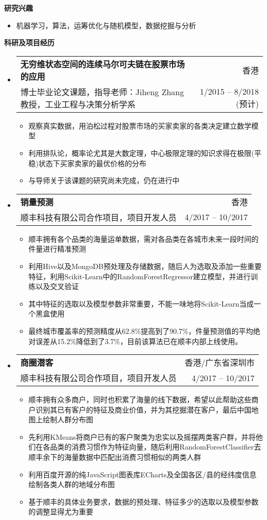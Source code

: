 \documentclass[letterpaper,9pt]{ctexart}
\makeatletter
\newcommand{\resitem}[1]{\item #1 \vspace{-2pt}}
\newcommand{\resheading}[1]{{\large \colorbox{mygrey}{\begin{minipage}{\textwidth}{\textbf{#1 \vphantom{p\^{E}}}}\end{minipage}}}}
\newcommand{\ressubheading}[4]{
\begin{tabular*}{6.5in}{l@{\extracolsep{\fill}}r}
    \textbf{#1} & #2 \\
    #3 & #4 \\
\end{tabular*}\vspace{-6pt}}
\makeatother
\begin{document}
\resheading{研究兴趣}
\begin{itemize}
\item 机器学习，算法，运筹优化与随机模型，数据挖掘与分析
\end{itemize}


\resheading{科研及项目经历}
\begin{itemize}
\item
\ressubheading{无穷维状态空间的连续马尔可夫链在股票市场的应用}{香港}{博士毕业论文课题，指导老师：Jiheng Zhang教授，工业工程与决策分析学系}{1/2015 -- 8/2018 (预计)}
\begin{itemize}
\resitem{观察真实数据，用泊松过程对股票市场的买家卖家的各类决定建立数学模型}
\resitem{利用排队论，概率论尤其是大数定理，中心极限定理的知识求得在极限(平稳)状态下买家卖家的最优价格的分布}
\resitem{与导师关于该课题的研究尚未完成，仍在进行中}
\end{itemize}


\item 
\ressubheading{销量预测}{香港}{顺丰科技有限公司合作项目，项目开发人员}{4/2017 -- 10/2017}
\begin{itemize}
\resitem{顺丰拥有各个品类的海量运单数据，需对各品类在各城市未来一段时间的件量进行精准预测}
\resitem{利用Hive以及MongoDB预处理及存储数据，随后人为选取及添加一些重要特征，利用Scikit-Learn中的RandomForestRegressor建立模型，并进行训练以及交叉验证}
\resitem{其中特征的选取以及模型参数非常重要，不能一味地将Scikit-Learn当成一个黑盒使用}
\resitem{最终城市覆盖率的预测精度从62.8\%提高到了90.7\%，件量预测值的平均绝对误差从15.2\%降低到了3.7\%，目前该算法已在顺丰内部上线使用。}
\end{itemize}


\item 
\ressubheading{商圈潜客}{香港/广东省深圳市}{顺丰科技有限公司合作项目，项目开发人员}{4/2017 -- 10/2017}
\begin{itemize}
\resitem{顺丰拥有众多商户，同时也积累了海量的线下数据，希望以此帮助这些商户识别其已有客户的特征及商业价值，并为其挖掘潜在客户，最后中国地图上绘制人群分布图}
\resitem{先利用KMeans将商户已有的客户聚类为忠实以及摇摆两类客户群，并将他们在各品类的消费习惯作为特征向量，随后利用RandomForestClassifier去顺丰余下的海量数据中匹配出消费习惯相似的两类人群}
\resitem{利用百度开源的纯JavaScript图表库ECharts及全国各区/县的经纬度信息绘制各类人群的地域分布图}
\resitem{基于顺丰的具体业务要求，数据的预处理、特征多少的选取以及模型参数的调整显得尤为重要}
\end{itemize}



\end{itemize}
\end{document}
